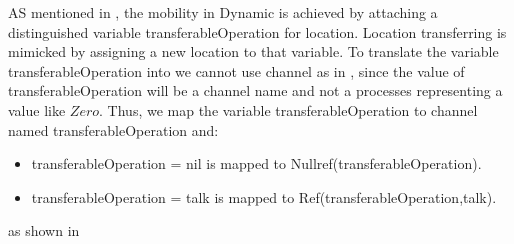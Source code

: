AS mentioned in , the mobility in Dynamic \oz{} is achieved
by attaching a distinguished variable transferableOperation for location. Location transferring
is mimicked by assigning a new location to that variable. To translate the variable transferableOperation into \picalc{} we cannot use \picalc{} channel as in , since the value of transferableOperation will be a channel name and not a processes representing a value like $Zero$. Thus, we map the variable transferableOperation to channel named transferableOperation and:

\begin{itemize}
\item transferableOperation = nil is mapped to Nullref(transferableOperation).

\item transferableOperation = talk is mapped to Ref(transferableOperation,talk).
\end{itemize}
as shown in  


